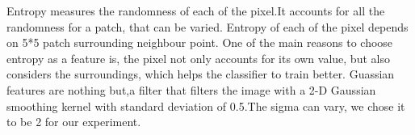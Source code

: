 \documentclass{article} %
\begin{document}
Entropy measures the randomness of each of the pixel.It accounts for all the randomness for a patch, that can be varied. Entropy of each of the pixel depends on 5*5 patch surrounding neighbour point. One of the main reasons to choose entropy as a feature is, the pixel not only accounts for its own value, but also considers the surroundings, which helps the classifier to train better.
Guassian features are nothing but,a filter  that filters the image with a 2-D Gaussian smoothing kernel with standard deviation of 0.5.The sigma can vary, we chose it to be 2 for our experiment.

\end{document}
